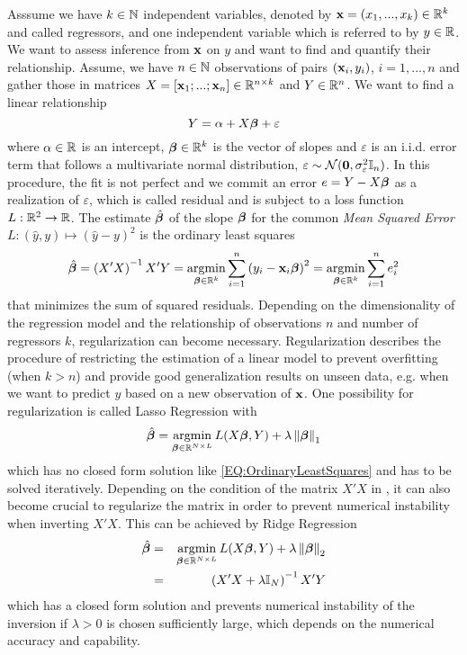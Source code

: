 Asssume we have $k \in \mathbb{N}$ independent variables, denoted by ${\bf x} = \left(x_1, ..., x_k\right) \in \mathbb{R}^k$ and called regressors, and one independent variable which is referred to by $y \in \mathbb{R}$. We want to assess inference from ${\bf x}$ on $y$ and want to find and quantify their relationship. Assume, we have $n \in \mathbb{N}$ observations of pairs $({\bf x}_i,y_i)$, $i=1,...,n$ and gather those in matrices $X = \left[{\bf x}_1;...;{\bf x}_n\right]\in \mathbb{R}^{n\times k}$ and $Y \in \mathbb{R}^{n}$. We want to find a linear relationship
\begin{equation}
    Y = \alpha + X {{\bm \beta}} + \varepsilon
\end{equation}
where $\alpha \in \mathbb{R}$ is an intercept, ${{\bm \beta}} \in \mathbb{R}^{k}$ is the vector of slopes and $\varepsilon$ is an i.i.d. error term that follows a multivariate normal distribution, $\varepsilon \sim \mathcal{N}({\bf 0}, \sigma_{\varepsilon}^2\mathbb{I}_{n})$.
In this procedure, the fit is not perfect and we commit an error $e = Y - X {{\bm \beta}}$ as a realization of $\varepsilon$, which is called residual and is subject to a loss function $L: \mathbb{R}^2 \to \mathbb{R}$.
The estimate $\hat{{{\bm \beta}}}$ of the slope ${{\bm \beta}}$ for the common \textit{Mean Squared Error} $L: (\hat y, y) \mapsto \left(\hat y - y\right)^2$ is the ordinary least squares
\begin{equation}
    \hat\bbeta = \left(X'X\right)^{-1}X'Y = \argmin_{\bbeta \in \R^k} \sum_{i=1}^{n} \left(y_i - \bx_i\bbeta\right)^2 = \argmin_{\bbeta \in \R^k} \sum_{i=1}^{n} e_i^2\label{EQ:OrdinaryLeastSquares}
\end{equation}
that minimizes the sum of squared residuals.
Depending on the dimensionality of the regression model and the relationship of observations $n$ and number of regressors $k$, regularization can become necessary.
Regularization describes the procedure of restricting the estimation of a linear model to prevent overfitting (when $k > n$) and provide good generalization results on unseen data, e.g. when we want to predict $y$ based on a new observation of ${\bf x}$.
One possibility for regularization is called Lasso Regression with
\begin{equation}
    \hat\bbeta = \argmin_{\bbeta \in \R^{N\times L}} L(X\bbeta, Y) + \lambda \norm{\bbeta}_1 \label{EQ:LassoRegression}
\end{equation}
which has no closed form solution like \ref{EQ:OrdinaryLeastSquares} and has to be solved iteratively. Depending on the condition of the matrix $X'X$ in , it can also become crucial to regularize the matrix in order to prevent numerical instability when inverting $X'X$. This can be achieved by Ridge Regression
\begin{eqnarray}
    \hat\bbeta &=& \argmin_{\bbeta \in \R^{N\times L}} L(X\bbeta , Y) + \lambda \norm{\bbeta}_2 \nonumber\\
    & = & \left(X'X + \lambda \one{N}\right)^{-1}X'Y \label{EQ:RidgeRegression}
\end{eqnarray}
which has a closed form solution and prevents numerical instability of the inversion if $\lambda > 0$ is chosen sufficiently large, which depends on the numerical accuracy and capability.


